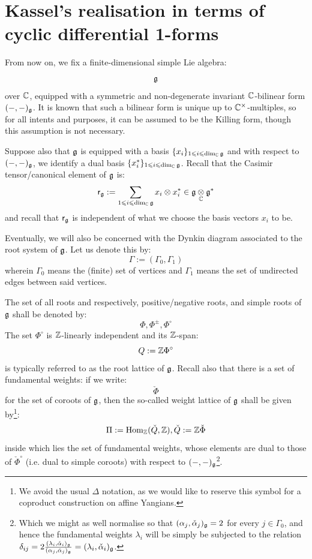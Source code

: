     \section{Kassel's realisation in terms of cyclic differential 1-forms}
        \begin{convention} \label{conv: a_fixed_finite_dimensional_simple_lie_algebra}
            From now on, we fix a finite-dimensional simple Lie algebra:
                $$\mathfrak{g}$$
            over $\mathbb{C}$, equipped with a symmetric and non-degenerate invariant $\mathbb{C}$-bilinear form $(-, -)_{\mathfrak{g}}$. It is known that such a bilinear form is unique up to $\bbC^{\x}$-multiples, so for all intents and purposes, it can be assumed to be the Killing form, though this assumption is not necessary. 
    
            Suppose also that $\mathfrak{g}$ is equipped with a basis $\{x_i\}_{1 \leqslant i \leqslant \dim_{\mathbb{C}} \mathfrak{g}}$ and with respect to $(-, -)_{\mathfrak{g}}$, we identify a dual basis $\{x_i^*\}_{1 \leqslant i \leqslant \dim_{\mathbb{C}} \mathfrak{g}}$. Recall that the Casimir tensor/canonical element of $\mathfrak{g}$ is:
                $$\sfr_{\g} := \sum_{1 \leq i \leq \dim_{\bbC} \g} x_i \tensor x_i^* \in \g \tensor_{\bbC} \g^*$$
            and recall that $\mathsf{r}_{\mathfrak{g}}$ is independent of what we choose the basis vectors $x_i$ to be.
    
            Eventually, we will also be concerned with the Dynkin diagram associated to the root system of $\mathfrak{g}$. Let us denote this by:
                $$\Gamma := (\Gamma_0, \Gamma_1)$$
            wherein $\Gamma_0$ means the (finite) set of vertices and $\Gamma_1$ means the set of undirected edges between said vertices. 
    
            The set of all roots and respectively, positive/negative roots, and simple roots of $\mathfrak{g}$ shall be denoted by:
                $$\Phi, \Phi^{\pm}, \Phi^{\circ}$$
            The set $\Phi^{\circ}$ is $\mathbb{Z}$-linearly independent and its $\mathbb{Z}$-span:
                $$Q := \mathbb{Z} \Phi^{\circ}$$
            is typically referred to as the root lattice of $\mathfrak{g}$. Recall also that there is a set of fundamental weights: if we write:
                $$\check{\Phi}$$
            for the set of coroots of $\mathfrak{g}$, then the so-called weight lattice of $\mathfrak{g}$ shall be given by\footnote{We avoid the usual $\Delta$ notation, as we would like to reserve this symbol for a coproduct construction on affine Yangians.}:
                $$\Pi := \mathrm{Hom}_{\mathbb{Z}}(\check{Q}, \mathbb{Z}), \check{Q} := \mathbb{Z}\check{\Phi}$$
            inside which lies the set of fundamental weights, whose elements are dual to those of $\check{\Phi}^{\circ}$ (i.e. dual to simple coroots) with respect to $(-, -)_{\mathfrak{g}}$\footnote{Which we might as well normalise so that $(\alpha_j, \check{\alpha}_j)_{\mathfrak{g}} = 2$ for every $j \in \Gamma_0$, and hence the fundamental weights $\lambda_i$ will be simply be subjected to the relation $\delta_{ij} = 2 \frac{(\lambda_i, \check{\alpha}_i)_{\mathfrak{g}}}{(\alpha_j, \check{\alpha}_j)_{\mathfrak{g}}} = (\lambda_i, \check{\alpha}_i)_{\mathfrak{g}}$.}.
        \end{convention}
    
